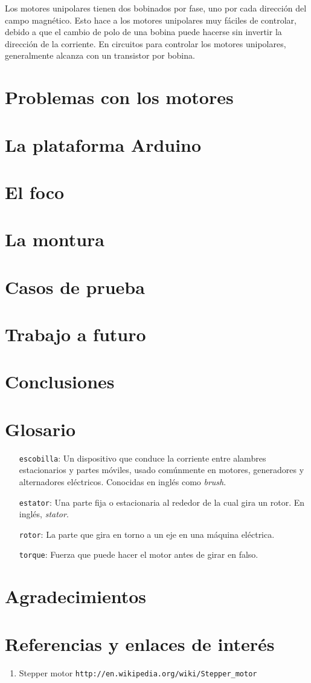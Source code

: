 \documentclass[final,narroweqnarray,inline,twoside]{ieee}
\begin{document}
Los motores unipolares tienen dos bobinados por fase, uno por cada dirección del campo magnético. Esto hace a los motores
unipolares muy fáciles de controlar, debido a que el cambio de polo de una bobina puede hacerse sin invertir la dirección de
la corriente. En circuitos para controlar los motores unipolares, generalmente alcanza con un transistor por bobina.
\section{Problemas con los motores}
\section{La plataforma Arduino}
\section{El foco}
\section{La montura}
\section{Casos de prueba}
\section{Trabajo a futuro}
\section{Conclusiones}
\section{Glosario}
\begin{enumerate}
 \item[\texttt{escobilla}:] Un dispositivo que conduce la corriente entre alambres estacionarios y partes móviles, usado
comúnmente en motores, generadores y alternadores eléctricos. Conocidas en inglés como \textit{brush}.
 \item[\texttt{estator}:] Una parte fija o estacionaria al rededor de la cual gira un rotor. En inglés, \textit{stator}.
 \item[\texttt{rotor}:] La parte que gira en torno a un eje en una máquina eléctrica.
 \item[\texttt{torque}:] Fuerza que puede hacer el motor antes de girar en falso.
\end{enumerate}

\section{Agradecimientos}

\section{Referencias y enlaces de interés}
\begin{enumerate}
\item Stepper motor\newline
\margin \texttt{http://en.wikipedia.org/wiki/Stepper\_motor}\\
\end{enumerate}
\end{document}
